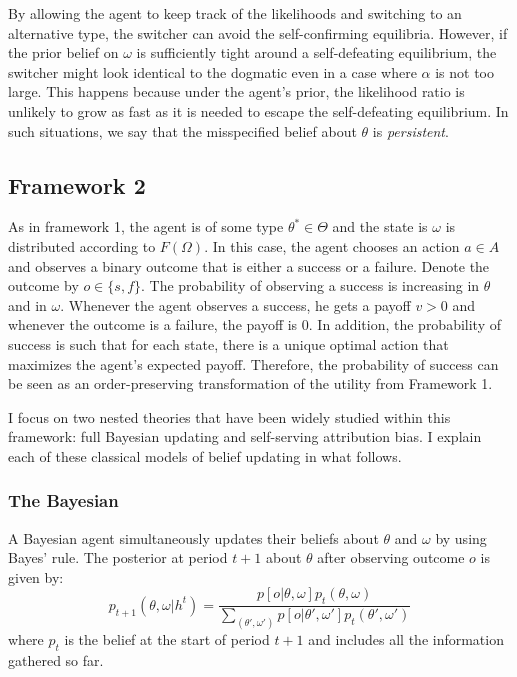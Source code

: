 \documentclass[
  12pt,
]{article}
\begin{document}
By allowing the agent to keep track of the likelihoods and switching to
an alternative type, the switcher can avoid the self-confirming
equilibria. However, if the prior belief on \(\omega\) is sufficiently
tight around a self-defeating equilibrium, the switcher might look
identical to the dogmatic even in a case where \(\alpha\) is not too
large. This happens because under the agent's prior, the likelihood
ratio is unlikely to grow as fast as it is needed to escape the
self-defeating equilibrium. In such situations, we say that the
misspecified belief about \(\theta\) is \emph{persistent}.

\hypertarget{framework-2}{%
\subsection{Framework 2}\label{framework-2}}

As in framework 1, the agent is of some type \(\theta^* \in \Theta\) and
the state is \(\omega\) is distributed according to \(F(\Omega)\). In
this case, the agent chooses an action \(a\in A\) and observes a binary
outcome that is either a success or a failure. Denote the outcome by
\(o \in \{s,f\}\). The probability of observing a success is increasing
in \(\theta\) and in \(\omega\). Whenever the agent observes a success,
he gets a payoff \(v>0\) and whenever the outcome is a failure, the
payoff is 0. In addition, the probability of success is such that for
each state, there is a unique optimal action that maximizes the agent's
expected payoff. Therefore, the probability of success can be seen as an
order-preserving transformation of the utility from Framework 1.

I focus on two nested theories that have been widely studied within this
framework: full Bayesian updating and self-serving attribution bias. I
explain each of these classical models of belief updating in what
follows.

\hypertarget{the-bayesian}{%
\subsubsection{The Bayesian}\label{the-bayesian}}

A Bayesian agent simultaneously updates their beliefs about \(\theta\)
and \(\omega\) by using Bayes' rule. The posterior at period \(t+1\)
about \(\theta\) after observing outcome \(o\) is given by: \[
p_{t+1}(\theta, \omega| h^t) = \frac{p[o|\theta, \omega]p_t(\theta, \omega)}{\sum_{(\theta', \omega')}p[o|\theta', \omega']p_t(\theta', \omega')}
\] where \(p_{t}\) is the belief at the start of period \(t+1\) and
includes all the information gathered so far.
\end{document}
